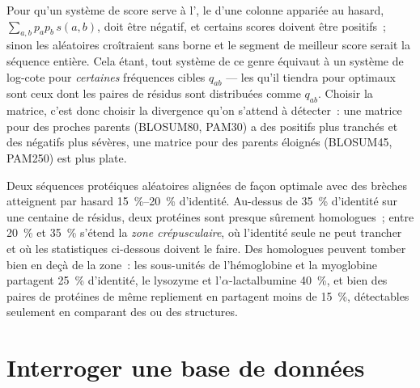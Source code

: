 \begin{proposition}\label{prop:b3:bioinformatics:logodds}
Pour qu'un système de score serve à l', le 
d'une colonne appariée au hasard, $\sum_{a,b} p_{a} p_{b}\, s(a,b)$,
doit être négatif, et certains scores doivent être positifs~; sinon les
 aléatoires croîtraient sans borne et le segment de meilleur
score serait la séquence entière. Cela étant, tout système de ce genre
équivaut à un système de log-cote pour \emph{certaines} fréquences
cibles $q_{ab}$ --- les  qu'il tiendra pour optimaux sont
ceux dont les paires de résidus sont distribuées comme $q_{ab}$.
Choisir la matrice, c'est donc choisir la divergence qu'on s'attend à
détecter~: une matrice pour des proches parents (BLOSUM80, PAM30) a des
positifs plus tranchés et des négatifs plus sévères, une matrice pour
des parents éloignés (BLOSUM45, PAM250) est plus plate.
\end{proposition}
\admitted

\begin{example}\label{ex:b3:bioinformatics:twilight}
Deux séquences protéiques aléatoires alignées de façon optimale avec
des brèches atteignent par hasard \qtyrange{15}{20}{\%} d'identité.
Au-dessus de \qty{35}{\%} d'identité sur une centaine de résidus, deux
protéines sont presque sûrement homologues~; entre \qty{20}{\%} et
\qty{35}{\%} s'étend la \emph{zone crépusculaire}, où l'identité seule
ne peut trancher et où les statistiques ci-dessous doivent le faire.
Des homologues peuvent tomber bien en deçà de la zone~: les
sous-unités de l'hémoglobine et la myoglobine partagent \qty{25}{\%}
d'identité, le lysozyme et l'$\alpha$-lactalbumine \qty{40}{\%}, et
bien des paires de protéines de même repliement en partagent moins de
\qty{15}{\%}, détectables seulement en comparant des  ou des
structures.
\end{example}

\section{Interroger une base de données}


